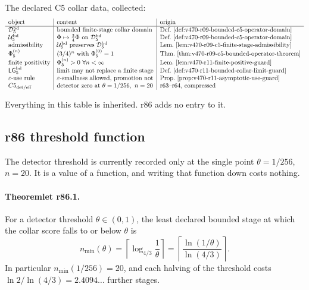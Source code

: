 The declared C5 collar data, collected:
\[
\begin{array}{l|l|l}
\text{object} & \text{content} & \text{origin}\\
\hline
\mathcal D_5^{\rm bd} & \text{bounded finite-stage collar domain} &
\text{Def.~\ref{def:v470-r09-bounded-c5-operator-domain}}\\
\mathcal U_5^{\rm bd} & \Phi\mapsto\tfrac34\Phi \text{ on }\mathcal D_5^{\rm bd} &
\text{Def.~\ref{def:v470-r09-bounded-c5-operator-domain}}\\
\text{admissibility} & \mathcal U_5^{\rm bd}\text{ preserves }\mathcal D_5^{\rm bd} &
\text{Lem.~\ref{lem:v470-r09-c5-finite-stage-admissibility}}\\
\Phi_5^{(n)} & (3/4)^n\text{ with }\Phi_5^{(0)}=1 &
\text{Thm.~\ref{thm:v470-r09-c5-bounded-operator-theorem}}\\
\text{finite positivity} & \Phi_5^{(n)}>0\ \forall n<\infty &
\text{Lem.~\ref{lem:v470-r11-finite-positive-guard}}\\
\mathsf{LG}_5^{\rm bd} & \text{limit may not replace a finite stage} &
\text{Def.~\ref{def:v470-r11-bounded-collar-limit-guard}}\\
\varepsilon\text{-use rule} & \varepsilon\text{-smallness allowed, promotion not} &
\text{Prop.~\ref{prop:v470-r11-asymptotic-use-guard}}\\
C5_{\rm det/eff} & \text{detector zero at }\theta=1/256,\ n=20 &
\text{r63--r64, compressed}
\end{array}
\]

Everything in this table is inherited.  r86 adds no entry to it.

\subsection*{r86 threshold function}
\label{subsec:r86-threshold-function}

The detector threshold is currently recorded only at the single point
\(\theta=1/256\), \(n=20\).  It is a value of a function, and writing that function down
costs nothing.

\paragraph{Theoremlet r86.1.}
For a detector threshold \(\theta\in(0,1)\), the least declared bounded stage at which the
collar score falls to or below \(\theta\) is
\[
n_{\min}(\theta)
=\left\lceil \log_{4/3}\!\frac1\theta \right\rceil
=\left\lceil \frac{\ln(1/\theta)}{\ln(4/3)} \right\rceil .
\]
In particular \(n_{\min}(1/256)=20\), and each halving of the threshold costs
\(\ln 2/\ln(4/3)=2.4094\ldots\) further stages.

